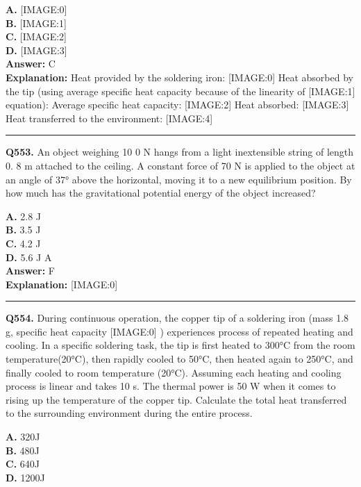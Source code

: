 \documentclass[12pt]{article}
\begin{document}
\textbf{A.} [IMAGE:0] \\
\textbf{B.} [IMAGE:1] \\
\textbf{C.} [IMAGE:2] \\
\textbf{D.} [IMAGE:3] \\

\textbf{Answer:} C \\
\textbf{Explanation:} Heat provided by the soldering iron:
[IMAGE:0]
Heat absorbed by the tip (using average specific heat capacity because of the linearity of
[IMAGE:1]
equation):
Average specific heat capacity:
[IMAGE:2]
Heat absorbed:
[IMAGE:3]
Heat transferred to the environment:
[IMAGE:4]

\hrule
\vspace{1em}


\noindent
\textbf{Q553.} An object weighing
10
0 N hangs from a light inextensible string of length 0.
8
m attached to the ceiling. A constant force of
70
N is applied to the object at an angle of 37° above the horizontal, moving it to a new equilibrium position. By how much has the gravitational potential energy of the object increased?



\textbf{A.} 2.8 J \\
\textbf{B.} 3.5 J \\
\textbf{C.} 4.2 J \\
\textbf{D.} 5.6 J
A \\

\textbf{Answer:} F \\
\textbf{Explanation:} [IMAGE:0]

\hrule
\vspace{1em}


\noindent
\textbf{Q554.} During continuous operation, the copper tip of a soldering iron (mass 1.8 g, specific heat capacity
[IMAGE:0]
) experiences process of repeated heating and cooling. In a specific soldering task, the tip is first heated to 300°C from the room temperature(20°C), then rapidly cooled to 50°C, then heated again to 250°C, and finally cooled to room temperature (20°C). Assuming each heating and cooling process is linear and takes 10 s. The thermal power is 50 W when it comes to rising up the temperature of the copper tip.
Calculate the total heat transferred to the surrounding environment during the entire process.



\textbf{A.} 320J \\
\textbf{B.} 480J \\
\textbf{C.} 640J \\
\textbf{D.} 1200J \\
\end{document}

